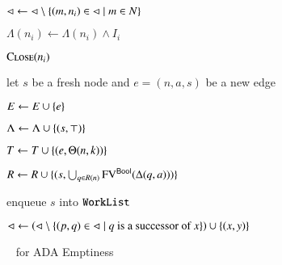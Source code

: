 \documentclass[10pt,conference,letterpaper,twocolumn]{IEEEtran}
\begin{document}
\begin{algorithm}[t!]
{\begin{algorithmic}[1]


  \State $\lhd \leftarrow \lhd \setminus \left\{ (m,n_i) \in \lhd \mid m \in N \right\}$

  \State $\Lambda(n_i) \leftarrow \Lambda(n_i) \wedge I_i$
  \label{ln:close-refine}

  \State $\Call{Close}{n_i}$
  \label{ln:refine-end}

  \EndIf

  \EndFor

  \EndIf

  \EndIf

  \label{ln:expand-begin}

  \State let $s$ be a fresh node and $e = (n,a,s)$ be a new edge

  \State $E \leftarrow E \cup \left\{ e \right\}$

  \State $\Lambda \leftarrow \Lambda \cup \left\{ (s,\top) \right\}$

  \State $T \leftarrow T \cup \left\{ (e, \Theta(n,k)) \right\}$

  \State $R \leftarrow R \cup \{(s,\bigcup_{q \in R(n)}\mathrm{FV}^{\mathsf{Bool}}(\Delta(q,a)))\}$

  \State enqueue $s$ into $\mathtt{WorkList}$
  \label{ln:expand-end}

  \EndFor

  \EndIf

  \EndWhile  
\end{algorithmic}

\begin{algorithmic}[1]



\State $\lhd \leftarrow \left(\lhd \setminus \left\{  (p,q) \in \lhd \mid
  \text{$q$ is a successor of $x$} \right\}\right) \cup \left\{ (x,y) \right\}$
\label{ln:close-uncover}


\EndIf

\EndFor

\EndFunction
\end{algorithmic}}
\caption{\impact~ for ADA Emptiness}
\label{alg:impact}
\end{algorithm}
\end{document}
